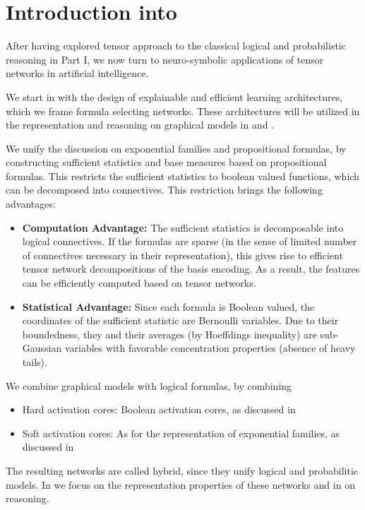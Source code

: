 \chapter{Introduction into }

After having explored tensor approach to the classical logical and probabilistic reasoning in Part I, we now turn to neuro-symbolic applications of tensor networks in artificial intelligence.

We start in  with the design of explainable and efficient learning architectures, which we frame formula selecting networks.
These architectures will be utilized in the representation and reasoning on graphical models in  and .



We unify the discussion on exponential families and propositional formulas, by constructing sufficient statistics and base measures based on propositional formulas.
This restricts the sufficient statistics to boolean valued functions, which can be decomposed into connectives.
This restriction brings the following advantages:
\begin{itemize}
	\item \textbf{Computation Advantage:} The sufficient statistics is decomposable into logical connectives.
	If the formulas are sparse (in the sense of limited number of connectives necessary in their representation), this gives rise to efficient tensor network decompositions of the basis encoding.
    As a result, the features can be efficiently computed based on tensor networks.
    \item \textbf{Statistical Advantage:} Since each formula is Boolean valued, the coordinates of the sufficient statistic are Bernoulli variables.
	Due to their boundedness, they and their averages (by Hoeffdings inequality) are sub-Gaussian variables with favorable concentration properties (absence of heavy tails).
\end{itemize}

We combine graphical models with logical formulas, by combining
\begin{itemize}
    \item Hard activation cores: Boolean activation cores, as discussed in 
    \item Soft activation cores: As for the representation of exponential families, as discussed in 
\end{itemize}
The resulting networks are called hybrid, since they unify logical and probabilitic models.
In  we focus on the representation properties of these networks and in  on reasoning.

